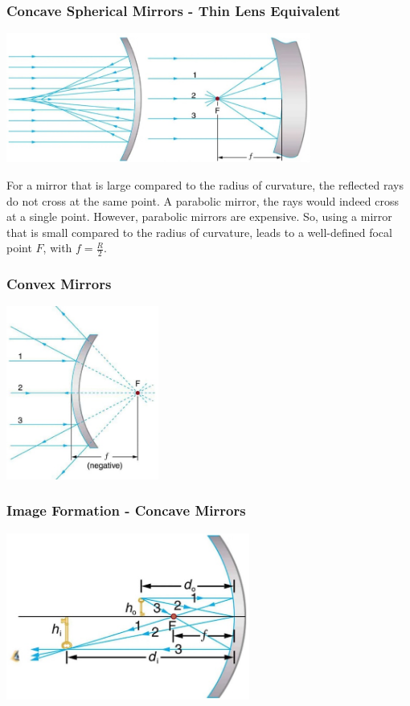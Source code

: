 \documentclass{beamer}
\begin{document}
\begin{frame}\frametitle{Concave Spherical Mirrors - Thin Lens Equivalent}

\begin{center}
\includegraphics[width=10cm]{fig/mirrorimage2.jpg}
\end{center}

For a mirror that is large compared to the radius of curvature, the reflected rays do not cross at the same point. A parabolic mirror, the rays would indeed cross at a single point. However, parabolic mirrors are expensive. So, using a mirror that is small compared to the radius of curvature, leads to a well-defined focal point $F$, with $f = \frac{R}{2}$.

\end{frame}

\begin{frame}\frametitle{Convex Mirrors}

\begin{center}
\includegraphics[width=5cm]{fig/mirrorimage3.jpg}
\end{center}

\end{frame}

\begin{frame}\frametitle{Image Formation - Concave Mirrors}

\begin{center}
\includegraphics[width=8cm]{fig/mirrorimage4.jpg}
\end{center}

\end{frame}
\end{document}
